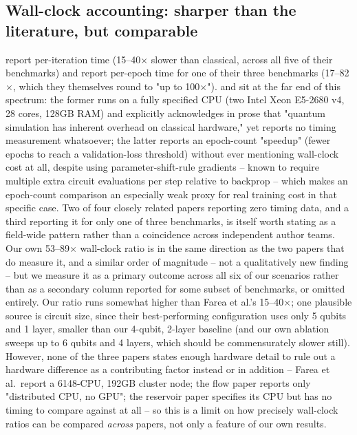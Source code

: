 \subsection{Wall-clock accounting: sharper than the literature, but comparable}
\citet{farea2025qcpinn} report per-iteration time (15--40$\times$ slower
than classical, across all five of their benchmarks) and
\citet{hqpinn2025flow} report per-epoch time for one of their three
benchmarks (17--82$\times$, which they themselves round to "up to
100$\times$"). \citet{qcpinn2025reservoir} and \citet{hqcpinn2026hydro} sit
at the far end of this spectrum: the former runs on a fully specified CPU
(two Intel Xeon E5-2680 v4, 28 cores, 128GB RAM) and explicitly
acknowledges in prose that "quantum simulation has inherent overhead on
classical hardware," yet reports no timing measurement whatsoever; the
latter reports an epoch-count "speedup" (fewer epochs to reach a
validation-loss threshold) without ever mentioning wall-clock cost at all,
despite using parameter-shift-rule gradients -- known to require multiple
extra circuit evaluations per step relative to backprop -- which makes an
epoch-count comparison an especially weak proxy for real training cost in
that specific case. Two of four closely related papers reporting zero
timing data, and a third reporting it for only one of three benchmarks, is
itself worth stating as a field-wide pattern rather than a coincidence
across independent author teams. Our own 53--89$\times$ wall-clock ratio is
in the same direction as the two papers that do measure it, and a similar
order of magnitude -- not a qualitatively new finding -- but we measure it
as a primary outcome across all six of our scenarios rather than as a
secondary column reported for some subset of benchmarks, or omitted
entirely. Our ratio runs somewhat higher than Farea et al.'s 15--40$\times$;
one plausible source is circuit size, since their best-performing
configuration uses only 5 qubits and 1 layer, smaller than our 4-qubit,
2-layer baseline (and our own ablation sweeps up to 6 qubits and 4 layers,
which should be commensurately slower still). However, none of the three
papers states enough hardware detail to rule out a hardware difference as
a contributing factor instead or in addition -- Farea et al.\ report a
6148-CPU, 192GB cluster node; the flow paper reports only "distributed
CPU, no GPU"; the reservoir paper specifies its CPU but has no timing to
compare against at all -- so this is a limit on how precisely wall-clock
ratios can be compared \emph{across} papers, not only a feature of our own
results.


